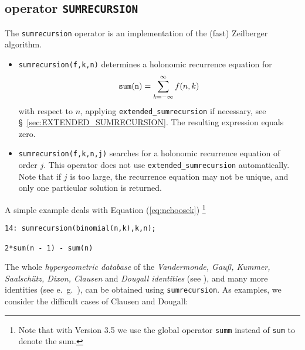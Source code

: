 \subsection{\REDUCE{} operator {\tt SUMRECURSION}}

The {\tt sumrecursion} operator is an implementation of the (fast)
Zeilberger algorithm.
\begin{itemize}
\item
{\tt sumrecursion(f,k,n)} determines a holonomic recurrence equation
for
\[
{\tt sum(n)} =\sum\limits_{k=-\infty}^\infty f(n,k)
\]
with respect to $n$, applying
{\tt extended\_sumrecursion} if necessary,
see \S~\ref{sec:EXTENDED_SUMRECURSION}.
The resulting expression equals zero.
\item
{\tt sumrecursion(f,k,n,j)} %
searches for a holonomic recurrence equation of order $j$. This
operator does not use {\tt extended\_sumrecursion} automatically.
Note that if $j$ is too large, the recurrence equation
may not be unique, and only one particular solution is returned.
\end{itemize}
A simple example deals with Equation (\ref{eq:nchoosek})%
\footnote{Note that with \REDUCE{} Version 3.5 we use the global operator
{\tt summ} instead of {\tt sum} to denote the sum.}

{\small
\begin{verbatim}
14: sumrecursion(binomial(n,k),k,n);

2*sum(n - 1) - sum(n)
\end{verbatim}
}\noindent
The whole \textsl{hypergeometric database} of the {\sl
Vandermonde, Gau{\ss}, Kummer, Saalsch\"utz, Dixon, Clausen} and \textsl{Dougall
identities} (see \cite{Wilf:93}), and many more identities (see e.\ g.\
\cite{Koepf:94b}), can be obtained using {\tt sumrecursion}.
As examples, we consider the difficult cases of Clausen and Dougall:%

